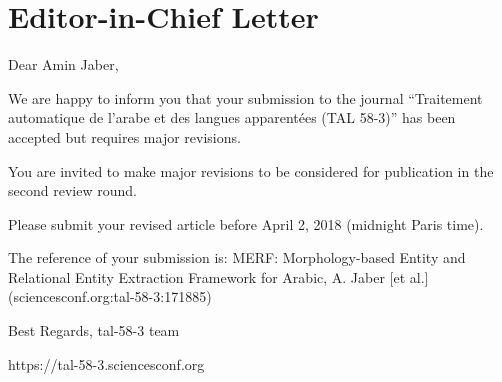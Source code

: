 \section*{Editor-in-Chief Letter}

Dear Amin Jaber,

We are happy to inform you that your submission to the journal 
``Traitement automatique de l'arabe et des langues apparentées (TAL 58-3)''
has been accepted but requires major revisions.

You are invited to make major revisions to be considered for publication in 
the second review round.

Please submit your revised article before April 2, 2018 (midnight Paris time).


The reference of your submission is:
MERF: Morphology-based Entity and Relational Entity Extraction Framework for Arabic, 
A. Jaber [et al.] (sciencesconf.org:tal-58-3:171885)

Best Regards,
tal-58-3 team

https://tal-58-3.sciencesconf.org
